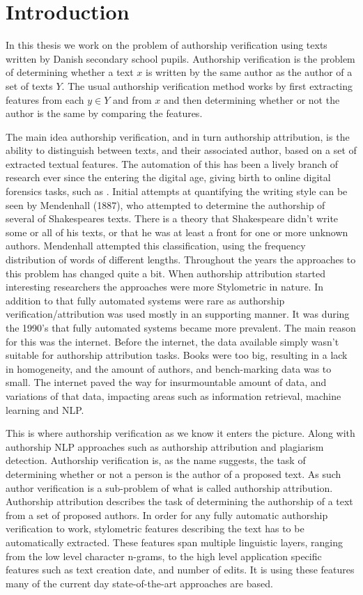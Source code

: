 \section{Introduction} \label{sec:introduction}

In this thesis we work on the problem of authorship verification using texts
written by Danish secondary school pupils. Authorship verification is the
problem of determining whether a text $x$ is written by the same author as the
author of a set of texts $Y$. The usual authorship verification method works by
first extracting features from each $y \in Y$ and from $x$ and then determining
whether or not the author is the same by comparing the features.

The main idea authorship verification, and in turn authorship attribution,
is the ability to distinguish between texts, and their associated author,
based on a set of extracted textual features. The automation of this has been
a lively branch of research ever since the entering the digital age, giving
birth to online digital forensics tasks, such as \cite{pan:2015}. Initial
attempts at quantifying the writing style can be seen by Mendenhall (1887), who
attempted to determine the authorship of several of Shakespeares texts. There
is a theory that Shakespeare didn't write some or all of his texts, or that he
was at least a front for one or more unknown authors. Mendenhall attempted this
classification, using the frequency distribution of words of different lengths.
Throughout the years the approaches to this problem has changed quite a bit.
When authorship attribution started interesting researchers the approaches were
more Stylometric in nature. In addition to that fully automated systems were
rare as authorship verification/attribution was used mostly in an supporting
manner. It was during the 1990's that fully automated systems became more
prevalent. The main reason for this was the internet. Before the internet, the
data available simply wasn't suitable for authorship attribution tasks. Books
were too big, resulting in a lack in homogeneity, and the amount of authors, and
bench-marking data was to small. The internet paved the way for insurmountable
amount of data, and variations of that data, impacting areas such as information
retrieval, machine learning and \gls{NLP}.

This is where authorship verification as we know it enters the picture. Along
with authorship \gls{NLP} approaches such as authorship attribution and
plagiarism detection. Authorship verification is, as the name suggests, the task
of determining whether or not a person is the author of a proposed text. As such
author verification is a sub-problem of what is called authorship attribution.
Authorship attribution describes the task of determining the authorship of a
text from a set of proposed authors. In order for any fully automatic authorship
verification to work, stylometric features describing the text has to be
automatically extracted. These features span multiple linguistic layers, ranging
from the low level character n-grams, to the high level application specific
features such as text creation date, and number of edits. It is using these
features many of the current day state-of-the-art approaches are based.

